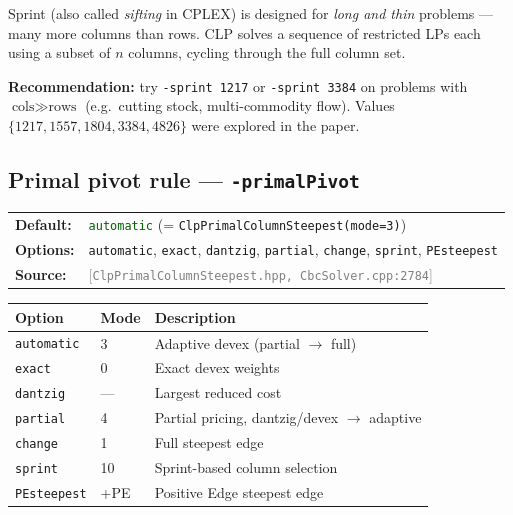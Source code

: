 \documentclass[11pt,a4paper]{article}
\newcommand{\param}[1]{\texttt{\textbf{#1}}}
\newcommand{\val}[1]{\texttt{#1}}
\newcommand{\src}[1]{\textcolor{gray}{\small[\texttt{#1}]}}
\newcommand{\default}[1]{\textcolor{darkgreen}{\texttt{#1}}}
\begin{document}
\medskip
Sprint (also called \emph{sifting} in CPLEX) is designed for \emph{long and thin}
problems --- many more columns than rows. CLP solves a sequence of restricted LPs
each using a subset of $n$ columns, cycling through the full column set.

\begin{tipbox}
  \textbf{Recommendation:} try \val{-sprint 1217} or \val{-sprint 3384} on
  problems with $\text{cols} \gg \text{rows}$ (e.g.\ cutting stock, multi-commodity
  flow). Values $\{1217, 1557, 1804, 3384, 4826\}$ were explored in the paper.
\end{tipbox}

\subsection{Primal pivot rule --- \param{-primalPivot}}

\begin{tabular}{@{}ll@{}}
  \textbf{Default:} & \default{automatic} (= \texttt{ClpPrimalColumnSteepest(mode=3)}) \\
  \textbf{Options:} & \val{automatic}, \val{exact}, \val{dantzig}, \val{partial},
                      \val{change}, \val{sprint}, \val{PEsteepest} \\
  \textbf{Source:}  & \src{ClpPrimalColumnSteepest.hpp, CbcSolver.cpp:2784}
\end{tabular}

\medskip
\begin{center}
\begin{tabular}{@{}P{2.5cm}P{1.5cm}P{7.5cm}@{}}
  \toprule
  \textbf{Option} & \textbf{Mode} & \textbf{Description} \\
  \midrule
  \val{automatic} & 3 & Adaptive devex (partial $\to$ full) \\
  \val{exact}     & 0 & Exact devex weights \\
  \val{dantzig}   & — & Largest reduced cost \\
  \val{partial}   & 4 & Partial pricing, dantzig/devex $\to$ adaptive \\
  \val{change}    & 1 & Full steepest edge \\
  \val{sprint}    & 10 & Sprint-based column selection \\
  \val{PEsteepest}& +PE & Positive Edge steepest edge \\
  \bottomrule
\end{tabular}
\end{center}
\end{document}
